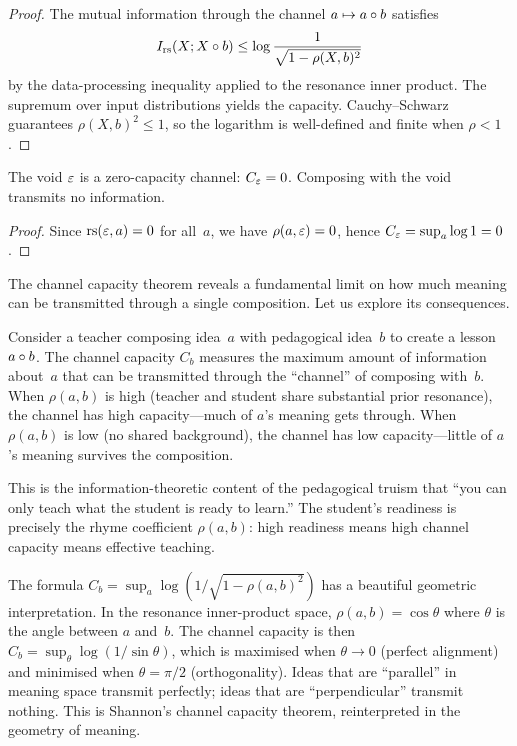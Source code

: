 \begin{proof}
The mutual information through the channel $a \mapsto a\circ b$
satisfies
\[
  I_{\mathrm{rs}}(X; X\circ b)
  \le \log \frac{1}{\sqrt{1-\rho(X,b)^2}}
\]
by the data-processing inequality applied to the resonance inner
product.  The supremum over input distributions yields the capacity.
Cauchy--Schwarz guarantees $\rho(X,b)^2 \le 1$, so the logarithm
is well-defined and finite when $\rho < 1$.
\end{proof}

\begin{corollary}
The void $\varepsilon$ is a zero-capacity channel: $C_\varepsilon = 0$.
Composing with the void transmits no information.
\end{corollary}

\begin{proof}
Since $\mathrm{rs}(\varepsilon, a) = 0$ for all~$a$, we have $\rho(a,\varepsilon) = 0$,
hence $C_\varepsilon = \sup_a \log 1 = 0$.
\end{proof}

\begin{remark}
The channel capacity theorem reveals a fundamental limit on how much
meaning can be transmitted through a single composition.  Let us
explore its consequences.

Consider a teacher composing idea~$a$ with pedagogical idea~$b$ to
create a lesson $a \circ b$.  The channel capacity $C_b$ measures
the maximum amount of information about~$a$ that can be transmitted
through the ``channel'' of composing with~$b$.  When $\rho(a, b)$ is
high (teacher and student share substantial prior resonance), the
channel has high capacity---much of $a$'s meaning gets through.  When
$\rho(a, b)$ is low (no shared background), the channel has low
capacity---little of $a$'s meaning survives the composition.

This is the information-theoretic content of the pedagogical truism
that ``you can only teach what the student is ready to learn.''  The
student's readiness is precisely the rhyme coefficient $\rho(a, b)$:
high readiness means high channel capacity means effective teaching.

The formula $C_b = \sup_a \log(1/\sqrt{1 - \rho(a,b)^2})$ has a
beautiful geometric interpretation.  In the resonance inner-product
space, $\rho(a,b) = \cos\theta$ where $\theta$ is the angle between
$a$ and~$b$.  The channel capacity is then $C_b = \sup_\theta
\log(1/\sin\theta)$, which is maximised when $\theta \to 0$ (perfect
alignment) and minimised when $\theta = \pi/2$ (orthogonality).  Ideas
that are ``parallel'' in meaning space transmit perfectly; ideas that
are ``perpendicular'' transmit nothing.  This is Shannon's channel
capacity theorem, reinterpreted in the geometry of meaning.
\end{remark}

